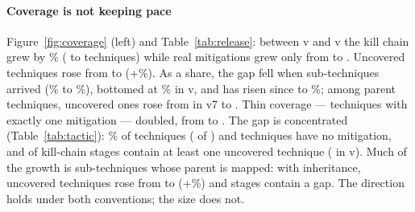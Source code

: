 \documentclass[conference,compsoc]{IEEEtran}
\begin{document}
\paragraph{Coverage is not keeping pace} Figure~\ref{fig:coverage} (left) and
Table~\ref{tab:release}: between v\GapFirstVersion{} and v\GapLastVersion{} the kill chain
grew by \GapTechGrowthPct\% (\GapFirstTech{} to \GapLastTech{} techniques) while real
mitigations grew only from \GapFirstMit{} to \GapLastMit. Uncovered techniques rose from
\GapFirstUnc{} to \GapLastUnc{} (+\GapUncGrowthPct\%). As a share, the gap fell when
sub-techniques arrived (\GapPreSubShare\% to \GapSubShare\%), bottomed at
\GapMinShare\% in v\GapMinShareVersion, and has risen since to \GapLastShare\%; among
parent techniques, uncovered ones rose from \GapParentsUncSub{} in v7 to
\GapParentsUncLast. Thin coverage --- techniques with exactly one mitigation --- doubled,
from \GapFirstSingle{} to \GapLastSingle. The gap is concentrated (Table~\ref{tab:tactic}):
\GapWorstSharePct\% of \GapWorstShareStage{} techniques (\GapWorstShareUnc{} of
\GapWorstShareTotal) and \GapWorstCountUnc{} \GapWorstCountStage{} techniques have no
mitigation, and \GapLastStages{} of \GapStages{} kill-chain stages contain at least one
uncovered technique (\GapFirstStages{} in v\GapFirstVersion). Much of the growth is
sub-techniques whose parent is mapped: with inheritance, uncovered techniques rose from
\GapInhFirstUnc{} to \GapInhUnc{} (+\GapInhGrowthPct\%) and \GapInhStages{} stages
contain a gap. The direction holds under both conventions; the size does not.
\end{document}
